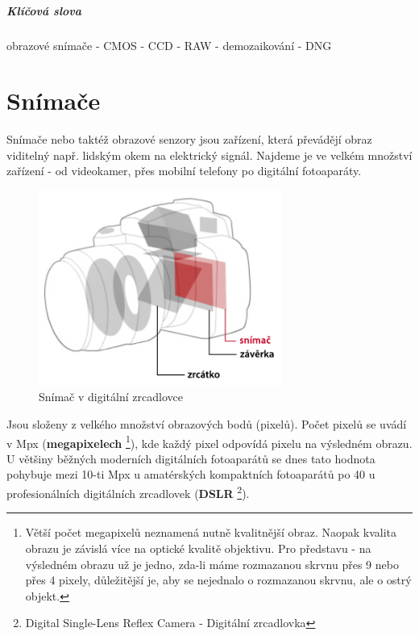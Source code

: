 \documentclass[12pt,a4paper,titlepage,final]{report}
\begin{document}
\paragraph{Klíčová slova} obrazové snímače - CMOS - CCD - RAW - demozaikování - DNG

	
	
\tableofcontents

\listoffigures

\newpage
\chapter{Snímače}

Snímače nebo taktéž obrazové senzory jsou zařízení, která převádějí obraz viditelný např. lidským okem na elektrický signál. Najdeme je ve velkém množství zařízení - od videokamer, přes mobilní telefony po digitální fotoaparáty.

\begin{figure}[ht]
\begin{center}
\includegraphics[width=8cm]{images/sensor.pdf}
\caption{Snímač v digitální zrcadlovce}
\label{fig:snimac}
\end{center}
\end{figure}

Jsou složeny z velkého množství obrazových bodů (pixelů). Počet pixelů se uvádí v Mpx (\textbf{megapixelech} \footnote{Větší počet megapixelů neznamená nutně kvalitnější obraz. Naopak kvalita obrazu je závislá více na optické kvalitě objektivu. Pro představu - na výsledném obrazu už je jedno, zda-li máme rozmazanou skrvnu přes 9 nebo přes 4 pixely, důležitější je, aby se nejednalo o rozmazanou skrvnu, ale o ostrý objekt.}), kde každý pixel odpovídá pixelu na výsledném obrazu. U většiny běžných moderních digitálních fotoaparátů se dnes tato hodnota pohybuje mezi 10-ti Mpx u amatérských kompaktních fotoaparátů po 40 u profesionálních digitálních zrcadlovek (\textbf{DSLR} \footnote{Digital Single-Lens Reflex Camera - Digitální zrcadlovka}).
\end{document}

